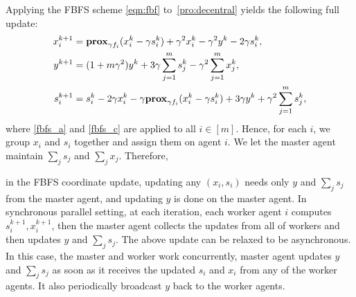 Applying the FBFS scheme \eqref{eqn:fbf} to~\eqref{pro:decentral} yields the following full update:
\begin{subequations}
\begin{align}
x_i^{k+1} &= \prox_{\gamma f_i}(x_i^k-\gamma s_i^k)+\gamma^2 x_i^{k}-\gamma^2 y^k-2\gamma s_i^k, \label{fbfs_a} \\
y^{k+1} &= (1+m\gamma^2)y^k +3\gamma \sum_{j=1}^m s_j^k -\gamma^2 \sum_{j=1}^m x_j^k,\\
s_i^{k+1} &= s_i^k-2\gamma x_i^k-\gamma \prox_{\gamma f_i}(x_i^k-\gamma s_i^k)+3\gamma y^k+ \gamma^2 \sum_{j=1}^m s_j^k, \label{fbfs_c}
\end{align}
\end{subequations}
where \eqref{fbfs_a} and \eqref{fbfs_c} are applied to all $i\in[m]$.
Hence, for each $i$, we group  $x_i$ and $s_i$ together and assign them on agent $i$.  {We let the master agent } maintain $\sum_j s_j$ and $\sum_j x_j$. Therefore, {in the FBFS coordinate update, updating any $(x_i,s_i)$ needs only $y$ and $\sum_j s_j$ from the master agent, and updating $y$ is done on the master agent. In synchronous parallel setting, at each iteration, each worker agent $i$ computes $s_i^{k+1}, x_i^{k+1}$, then the master agent collects the updates from all of workers and then updates $y$ and $\sum_j s_j$. The above update can be relaxed to be asynchronous. In this case, the master and worker work concurrently, master agent updates $y$ and $\sum_j s_j$ as soon as it receives the updated $s_i$ and $x_i$ from any of the worker agents. It also periodically broadcast $y$ back to the worker agents.


}
